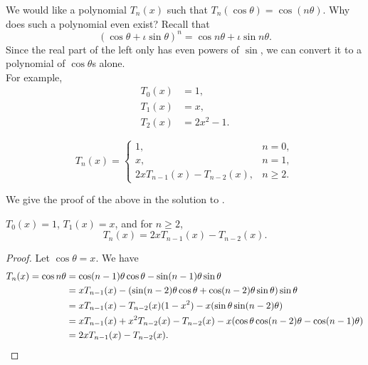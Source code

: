 	We would like a polynomial $T_n(x)$ such that $T_n(\cos\theta) = \cos(n\theta)$. Why does such a polynomial even exist? Recall that
	\[ (\cos \theta + \iota \sin \theta)^n = \cos n\theta + \iota \sin n\theta. \]
	Since the real part of the left only has even powers of $\sin$, we can convert it to a polynomial of $\cos\theta$s alone.\\
	For example,
	\begin{align*}
		T_0(x) &= 1, \\
		T_1(x) &= x, \\
		T_2(x) &= 2x^2-1.
	\end{align*}

	\begin{fprop}
		\label{prop: recurrence of Tn}
		\[ T_n(x) = \begin{cases} 1, & n=0, \\ x, & n=1, \\ 2xT_{n-1}(x) - T_{n-2}(x), & n \ge 2. \end{cases} \]
	\end{fprop}
	We give the proof of the above in the solution to .

	\begin{fprop}
		\label{problem: recurrence of Chebyshev of the first kind}
		$T_0(x) = 1$, $T_1(x) = x$, and for $n \ge 2$,
		\[ T_n(x) = 2xT_{n-1}(x) - T_{n-2}(x). \]
	\end{fprop}
	\begin{proof}
		Let $\cos \theta = x$. We have
		\begin{align*}
			T_n(x) = \cos n\theta &= \cos (n-1)\theta \cos \theta - \sin (n-1)\theta \sin \theta \\
				&= x T_{n-1}(x) - ( \sin (n-2)\theta \cos\theta + \cos (n-2)\theta \sin\theta ) \sin\theta \\
				&= x T_{n-1}(x) - T_{n-2}(x) (1-x^2) - x (\sin\theta \sin (n-2)\theta) \\
				&= x T_{n-1}(x) + x^2 T_{n-2}(x) - T_{n-2}(x) - x (\cos\theta \cos (n-2)\theta - \cos (n-1)\theta) \\
				&= 2x T_{n-1}(x) - T_{n-2}(x). \qedhere
		\end{align*}
	\end{proof}



